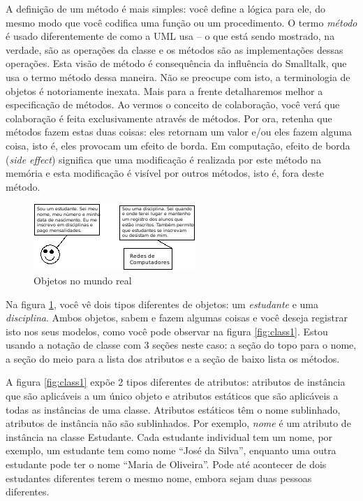 \documentclass[
	11pt,				%
	openright,
	twoside,			%
	a4paper,			%
	english,			%
	french,
	brazil,				%
	sumario=tradicional
	]{abntex2}
\begin{document}
A definição de um método é mais simples: você define a lógica para ele, do mesmo modo que você codifica uma função ou um procedimento. O termo \emph{método} é usado diferentemente de como a UML usa -- o que está sendo mostrado, na verdade, são as operações da classe e os métodos são as implementações dessas operações. Esta visão de método é consequência da influência do Smalltalk, que usa o termo método dessa maneira. Não se preocupe com isto, a terminologia de objetos é notoriamente inexata. Mais para a frente detalharemos melhor a especificação de métodos. Ao vermos o conceito de colaboração, você verá que colaboração é feita exclusivamente através de métodos. Por ora, retenha que métodos fazem estas duas coisas: eles retornam um valor e/ou eles fazem alguma coisa, isto é, eles provocam um efeito de borda. Em computação, efeito de borda (\emph{side effect}) significa que uma modificação é realizada por este método na memória e esta modificação é visível por outros métodos, isto é, fora deste método.

\begin{figure}
\begin{center}
\includegraphics[scale=1]{obj2.png} 
\caption[Objetos no mundo real]{Objetos no mundo real} \label{fig:obj2}
\end{center}
\end{figure}

Na figura \ref{fig:obj2}, você vê dois tipos diferentes de objetos: um \textit{estudante} e uma \textit{disciplina}. Ambos objetos, sabem e fazem algumas coisas e você deseja registrar isto nos seus modelos, como você pode observar na figura \ref{fig:class1}. Estou usando a notação de classe com 3 seções neste caso: a seção do topo para o nome, a seção do meio para a lista dos atributos e a seção de baixo lista os métodos.

A figura \ref{fig:class1} expõe 2 tipos diferentes de atributos: atributos de instância que são aplicáveis a um único objeto e atributos estáticos que são aplicáveis a todas as instâncias de uma classe. Atributos estáticos têm o nome sublinhado, atributos de instância não são sublinhados. Por exemplo, \emph{nome} é um atributo de instância na classe Estudante. Cada estudante individual tem um nome, por exemplo, um estudante tem como nome ``José da Silva'', enquanto uma outra estudante pode ter o nome ``Maria de Oliveira''. Pode até acontecer de dois estudantes diferentes terem o mesmo nome, embora sejam duas pessoas diferentes.
\end{document}
